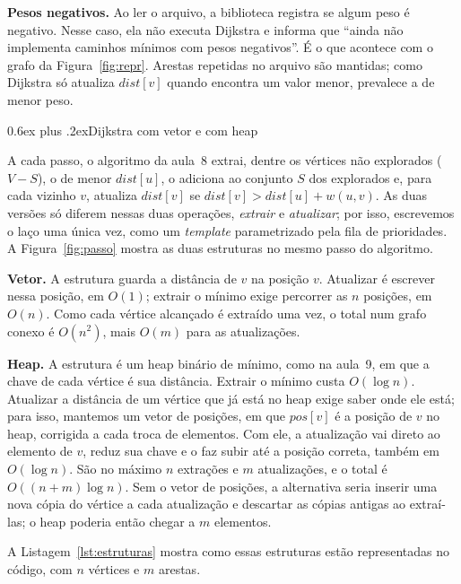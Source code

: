 \documentclass[a4paper,11pt]{article}
\makeatletter
\newcommand{\dist}{\mathit{dist}}
\newcommand{\pos}{\mathit{pos}}
\renewcommand\subsection{\@startsection{subsection}{2}{\z@}{-1.8ex plus -.5ex minus -.2ex}%
  {0.6ex plus .2ex}{\normalfont\normalsize\bfseries}}
\makeatother
\begin{document}
\textbf{Pesos negativos.} Ao ler o arquivo, a biblioteca registra se algum peso é negativo.
Nesse caso, ela não executa Dijkstra e informa que ``ainda não implementa caminhos
mínimos com pesos negativos''. É o que acontece com o grafo da Figura~\ref{fig:repr}. Arestas repetidas
no arquivo são mantidas; como Dijkstra só atualiza $\dist[v]$ quando encontra um valor menor,
prevalece a de menor peso.

\subsection{Dijkstra com vetor e com heap}

A cada passo, o algoritmo da aula~8 extrai, dentre os vértices não explorados ($V-S$), o de
menor $\dist[u]$, o adiciona ao conjunto $S$ dos explorados e, para cada vizinho $v$, atualiza
$\dist[v]$ se $\dist[v] > \dist[u] + w(u,v)$. As duas versões só diferem nessas duas operações,
\emph{extrair} e \emph{atualizar}; por isso, escrevemos o laço uma única vez, como um
\emph{template} parametrizado pela fila de prioridades. A Figura~\ref{fig:passo} mostra as duas
estruturas no mesmo passo do algoritmo.

\textbf{Vetor.} A estrutura guarda a distância de $v$ na posição $v$. Atualizar é escrever
nessa posição, em $O(1)$; extrair o mínimo exige percorrer as $n$ posições, em $O(n)$. Como cada
vértice alcançado é extraído uma vez, o total num grafo conexo é $O(n^2)$, mais $O(m)$ para as
atualizações.

\textbf{Heap.} A estrutura é um heap binário de mínimo, como na aula~9, em que a chave de cada
vértice é sua distância. Extrair o mínimo custa $O(\log n)$.
Atualizar a distância de um vértice que já está no heap exige saber onde ele está; para isso,
mantemos um vetor de posições, em que $\pos[v]$ é a posição de $v$ no heap, corrigida a cada
troca de elementos. Com ele, a atualização vai direto ao elemento de $v$, reduz sua chave e o
faz subir até a posição correta, também em $O(\log n)$. São no máximo $n$ extrações e $m$
atualizações, e o total é $O((n+m)\log n)$. Sem o vetor de posições, a alternativa seria inserir
uma nova cópia do vértice a cada atualização e descartar as cópias antigas ao extraí-las; o heap
poderia então chegar a $m$ elementos.

A Listagem~\ref{lst:estruturas} mostra como essas estruturas estão representadas no código,
com $n$ vértices e $m$ arestas.
\end{document}
